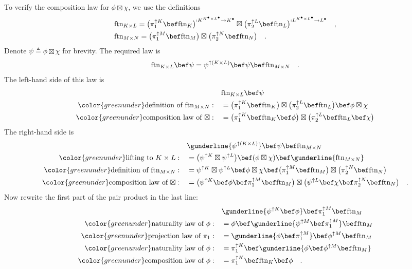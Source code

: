 To verify the composition law for $\phi\boxtimes\chi$, we use the
definitions 
\begin{align*}
 & \text{ftn}_{K\times L}=\big(\pi_{1}^{\uparrow K}\bef\text{ftn}_{K}\big)^{:K^{K^{\bullet}\times L^{\bullet}}\rightarrow K^{\bullet}}\boxtimes\big(\pi_{2}^{\uparrow L}\bef\text{ftn}_{L}\big)^{:L^{K^{\bullet}\times L^{\bullet}}\rightarrow L^{\bullet}}\quad,\\
 & \text{ftn}_{M\times N}=\big(\pi_{1}^{\uparrow M}\bef\text{ftn}_{M}\big)\boxtimes\big(\pi_{2}^{\uparrow N}\bef\text{ftn}_{N}\big)\quad.
\end{align*}
Denote $\psi\triangleq\phi\boxtimes\chi$ for brevity. The required
law is
\[
\text{ftn}_{K\times L}\bef\psi=\psi^{\uparrow(K\times L)}\bef\psi\bef\text{ftn}_{M\times N}\quad.
\]
The left-hand side of this law is
\begin{align*}
 & \text{ftn}_{K\times L}\bef\psi\\
{\color{greenunder}\text{definition of }\text{ftn}_{M\times N}:}\quad & =\big(\pi_{1}^{\uparrow K}\bef\text{ftn}_{K}\big)\boxtimes\big(\pi_{2}^{\uparrow L}\bef\text{ftn}_{L}\big)\bef\phi\boxtimes\chi\\
{\color{greenunder}\text{composition law of }\boxtimes:}\quad & =\big(\pi_{1}^{\uparrow K}\bef\text{ftn}_{K}\bef\phi\big)\boxtimes\big(\pi_{2}^{\uparrow L}\bef\text{ftn}_{L}\bef\chi\big)
\end{align*}
The right-hand side is
\begin{align*}
 & \gunderline{\psi^{\uparrow(K\times L)}}\bef\psi\bef\text{ftn}_{M\times N}\\
{\color{greenunder}\text{lifting to }K\times L:}\quad & =\big(\psi^{\uparrow K}\boxtimes\psi^{\uparrow L}\big)\bef(\phi\boxtimes\chi)\bef\gunderline{\text{ftn}_{M\times N}}\\
{\color{greenunder}\text{definition of }\text{ftn}_{M\times N}:}\quad & =\psi^{\uparrow K}\boxtimes\psi^{\uparrow L}\bef\phi\boxtimes\chi\bef\big(\pi_{1}^{\uparrow M}\bef\text{ftn}_{M}\big)\boxtimes\big(\pi_{2}^{\uparrow N}\bef\text{ftn}_{N}\big)\\
{\color{greenunder}\text{composition law of }\boxtimes:}\quad & =\big(\psi^{\uparrow K}\bef\phi\bef\pi_{1}^{\uparrow M}\bef\text{ftn}_{M}\big)\boxtimes\big(\psi^{\uparrow L}\bef\chi\bef\pi_{2}^{\uparrow N}\bef\text{ftn}_{N}\big)\quad.
\end{align*}
Now rewrite the first part of the pair product in the last line:
\begin{align*}
 & \gunderline{\psi^{\uparrow K}\bef\phi}\bef\pi_{1}^{\uparrow M}\bef\text{ftn}_{M}\\
{\color{greenunder}\text{naturality law of }\phi:}\quad & =\phi\bef\gunderline{\psi^{\uparrow M}\bef\pi_{1}^{\uparrow M}}\bef\text{ftn}_{M}\\
{\color{greenunder}\text{projection law of }\pi_{1}:}\quad & =\gunderline{\phi\bef\pi_{1}^{\uparrow M}}\bef\phi^{\uparrow M}\bef\text{ftn}_{M}\\
{\color{greenunder}\text{naturality law of }\phi:}\quad & =\pi_{1}^{\uparrow K}\bef\gunderline{\phi\bef\phi^{\uparrow M}\bef\text{ftn}_{M}}\\
{\color{greenunder}\text{composition law of }\phi:}\quad & =\pi_{1}^{\uparrow K}\bef\text{ftn}_{K}\bef\phi\quad.
\end{align*}
